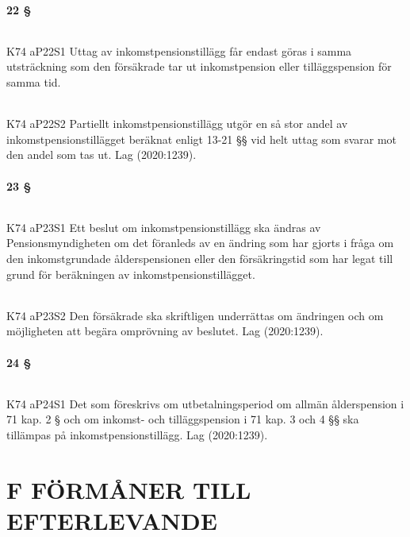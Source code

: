 \documentclass[a4paper,notitlepage,openany,10pt]{book}
\begin{document}
\subsection*{22 §}
\paragraph*{}
{\tiny K74 aP22S1}
Uttag av inkomstpensionstillägg får endast göras i samma utsträckning som den försäkrade tar ut inkomstpension eller tilläggspension för samma tid.
\paragraph*{}
{\tiny K74 aP22S2}
Partiellt inkomstpensionstillägg utgör en så stor andel av inkomstpensionstillägget beräknat enligt 13-21 §§ vid helt uttag som svarar mot den andel som tas ut.
Lag (2020:1239).
\subsection*{23 §}
\paragraph*{}
{\tiny K74 aP23S1}
Ett beslut om inkomstpensionstillägg ska ändras av Pensionsmyndigheten om det föranleds av en ändring som har gjorts i fråga om den inkomstgrundade ålderspensionen eller den försäkringstid som har legat till grund för beräkningen av inkomstpensionstillägget.
\paragraph*{}
{\tiny K74 aP23S2}
Den försäkrade ska skriftligen underrättas om ändringen och om möjligheten att begära omprövning av beslutet.
Lag (2020:1239).
\subsection*{24 §}
\paragraph*{}
{\tiny K74 aP24S1}
Det som föreskrivs om utbetalningsperiod om allmän ålderspension i 71 kap. 2 § och om inkomst- och tilläggspension i 71 kap. 3 och 4 §§ ska tillämpas på inkomstpensionstillägg.
Lag (2020:1239).
\part*{F FÖRMÅNER TILL EFTERLEVANDE}
\end{document}
